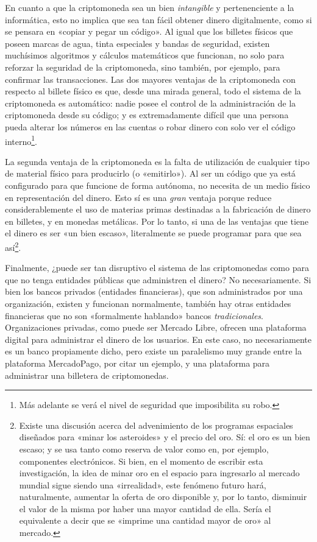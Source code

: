 \documentclass[12pt,a4paper,twoside]{book}
\begin{document}
En cuanto a que la criptomoneda sea un bien \textit{intangible} y pertenenciente a la informática, esto no implica que sea tan fácil obtener dinero digitalmente, como si se pensara en «copiar y pegar un código». Al igual que los billetes físicos que poseen marcas de agua, tinta especiales y bandas de seguridad, existen muchísimos algoritmos y cálculos matemáticos que funcionan, no solo para reforzar la seguridad de la criptomoneda, sino también, por ejemplo, para confirmar las transacciones. Las dos mayores ventajas de la criptomoneda con respecto al billete físico es que, desde una mirada general, todo el sistema de la criptomoneda es automático: nadie posee el control de la administración de la criptomoneda desde su código; y es extremadamente difícil que una persona pueda alterar los números en las cuentas o robar dinero con solo ver el código interno\footnote{ Más adelante se verá el nivel de seguridad que imposibilita su robo.}.

La segunda ventaja de la criptomoneda es la falta de utilización de cualquier tipo de material físico para producirlo (o «emitirlo»). Al ser un código que ya está configurado para que funcione de forma autónoma, no necesita de un medio físico en representación del dinero. Esto sí es una \textit{gran} ventaja porque reduce considerablemente el uso de materias primas destinadas a la fabricación de dinero en billetes, y en monedas metálicas. Por lo tanto, si una de las ventajas que tiene el dinero es ser «un bien escaso», literalmente se puede programar para que sea así\footnote{Existe una discusión acerca del advenimiento de los programas espaciales diseñados para «minar los asteroides» y el precio del oro. Sí: el oro es un bien escaso; y se usa tanto como reserva de valor como en, por ejemplo, componentes electrónicos. Si bien, en el momento de escribir esta investigación, la idea de minar oro en el espacio para ingresarlo al mercado mundial sigue siendo una «irrealidad», este fenómeno futuro hará, naturalmente, aumentar la oferta de oro disponible y, por lo tanto, disminuir el valor de la misma por haber una mayor cantidad de ella. Sería el equivalente a decir que se «imprime una cantidad mayor de oro» al mercado.}.

Finalmente, ¿puede ser tan disruptivo el sistema de las criptomonedas como para que no tenga entidades públicas que administren el dinero? No necesariamente. Si bien los bancos privados (entidades financieras), que son administrados por una organización, existen y funcionan normalmente, también hay otras entidades financieras que no son «formalmente hablando» bancos \textit{tradicionales}. Organizaciones privadas, como puede ser Mercado Libre, ofrecen una plataforma digital para administrar el dinero de los usuarios. En este caso, no necesariamente es un banco propiamente dicho, pero existe un paralelismo muy grande entre la plataforma MercadoPago, por citar un ejemplo, y una plataforma para administrar una billetera de criptomonedas.
\end{document}

